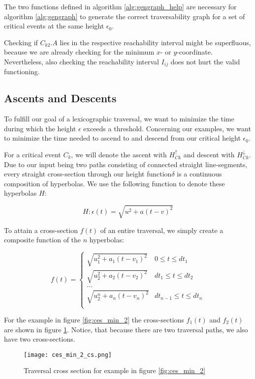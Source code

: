 The two functions defined in algorithm \ref{alg:gengraph_help} are necessary for algorithm \ref{alg:gengraph} to generate the correct traversability graph for a set of critical events at the same height $\epsilon_0$.

Checking if $C_{k2}.A$ lies in the respective reachability interval might be superfluous, because we are already checking for the minimum $x$- or $y$-coordinate. Nevertheless, also checking the reachability interval $I_{ij}$ does not hurt the valid functioning.


\subsection{Ascents and Descents}

To fulfill our goal of a lexicographic traversal, we want to minimize the time during which the height $\epsilon$ exceeds a threshold.\cite{rotelex} Concerning our examples, we want to minimize the time needed to ascend to and descend from our critical height $\epsilon_0$. 

For a critical event $C_k$, we will denote the ascent with $H_{Ck}^\uparrow$ and descent with $H_{Ck}^\downarrow$. Due to our input being two paths consisting of connected straight line-segments, every straight cross-section through our height function$\delta$ is a continuous composition of hyperbolas. We use the following function to denote these hyperbolas $H$:

$$H: \epsilon(t) = \sqrt{u^2 + a(t - v)^2}$$

To attain a cross-section $f(t)$ of an entire traversal, we simply create a composite function of the $n$ hyperbolas:

\[ f(t) =
\begin{cases} 
	\sqrt{u_1^2 + a_1(t - v_1)^2} & 0 \leq t \leq dt_1 \\
	\sqrt{u_2^2 + a_2(t - v_2)^2} & dt_1 \leq t \leq dt_2 \\
	\dots \\
	\sqrt{u_2^n + a_n(t - v_n)^2} & dt_{n-1} \leq t \leq dt_n \\
\end{cases}
\]

For the example in figure \ref{fig:ces_min_2} the cross-sections $f_1(t)$ and $f_2(t)$ are shown in figure \ref{fig:ces_min_2_cs}. Notice, that because there are two traversal paths, we also have two cross-sections.

 \begin{figure}[H]
    \centering
    
    \texttt{[image: ces\_min\_2\_cs.png]}
		
	\caption{Traversal cross section for example in figure \ref{fig:ces_min_2}\protect\footnotemark}
    \label{fig:ces_min_2_cs}
\end{figure}

